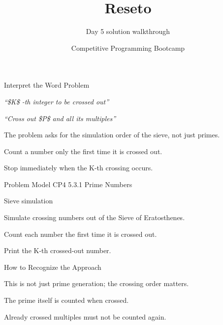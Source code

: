 \documentclass[aspectratio=169,11pt]{beamer}
\title[reseto]{Reseto}
\subtitle{Day 5 solution walkthrough}
\author[Solution Deck]{Competitive Programming Bootcamp}
\date{}
\begin{document}
\begin{frame}[plain]
  \titlepage
\end{frame}

\begin{frame}{Interpret the Word Problem}
\small
{}
\begin{tightitemize}
  \item \textit{``\$K\$ -th integer to be crossed out''}
  \item \textit{``Cross out \$P\$ and all its multiples''}
\end{tightitemize}

\vspace{0.18cm}
\begin{tightitemize}
  \item The problem asks for the simulation order of the sieve, not just primes.
  \item Count a number only the first time it is crossed out.
  \item Stop immediately when the K-th crossing occurs.
\end{tightitemize}
\end{frame}







\begin{frame}{Problem Model}
\small
{} CP4 5.3.1 Prime Numbers

\vspace{0.25cm}
 Sieve simulation

\vspace{0.25cm}
\begin{tightitemize}
  \item Simulate crossing numbers out of the Sieve of Eratosthenes.
  \item Count each number the first time it is crossed out.
  \item Print the K-th crossed-out number.
\end{tightitemize}
\end{frame}

\begin{frame}{How to Recognize the Approach}
\begin{tightitemize}
  \item This is not just prime generation; the crossing order matters.
  \item The prime itself is counted when crossed.
  \item Already crossed multiples must not be counted again.
\end{tightitemize}
\end{frame}
\end{document}
